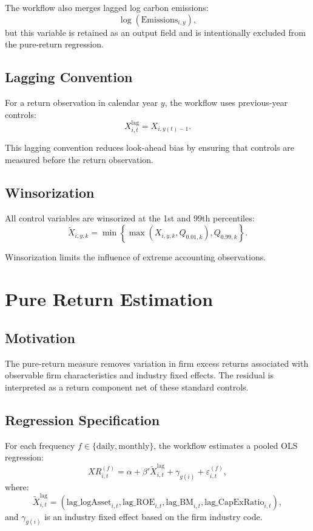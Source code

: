 \documentclass[11pt]{article}
\begin{document}
The workflow also merges lagged log carbon emissions:
\[
\log(\mathrm{Emissions}_{i,y}),
\]
but this variable is retained as an output field and is intentionally excluded
from the pure-return regression.

\subsection{Lagging Convention}

For a return observation in calendar year \(y\), the workflow uses previous-year
controls:
\begin{equation}
X^{\mathrm{lag}}_{i,t}
=
X_{i,y(t)-1}.
\end{equation}

This lagging convention reduces look-ahead bias by ensuring that controls are
measured before the return observation.

\subsection{Winsorization}

All control variables are winsorized at the 1st and 99th percentiles:
\begin{equation}
\widetilde{X}_{i,y,k}
=
\min\left\{
\max\left(X_{i,y,k}, Q_{0.01,k}\right),
Q_{0.99,k}
\right\}.
\end{equation}

Winsorization limits the influence of extreme accounting observations.

\section{Pure Return Estimation}

\subsection{Motivation}

The pure-return measure removes variation in firm excess returns associated
with observable firm characteristics and industry fixed effects. The residual is
interpreted as a return component net of these standard controls.

\subsection{Regression Specification}

For each frequency \(f \in \{\mathrm{daily}, \mathrm{monthly}\}\), the workflow
estimates a pooled OLS regression:
\begin{equation}
XR_{i,t}^{(f)}
=
\alpha
+ \beta' \widetilde{X}^{\mathrm{lag}}_{i,t}
+ \gamma_{g(i)}
+ \varepsilon_{i,t}^{(f)},
\end{equation}
where:
\[
\widetilde{X}^{\mathrm{lag}}_{i,t}
=
\left(
\mathrm{lag\_logAsset}_{i,t},
\mathrm{lag\_ROE}_{i,t},
\mathrm{lag\_BM}_{i,t},
\mathrm{lag\_CapExRatio}_{i,t}
\right),
\]
and \(\gamma_{g(i)}\) is an industry fixed effect based on the firm industry
code.
\end{document}
